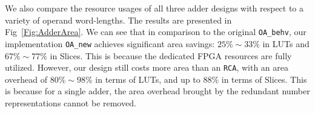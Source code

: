 \documentclass[conference]{IEEEtran}
\begin{document}
We also compare the resource usages of all three adder designs with respect to a variety of operand word-lengths. The results are presented in Fig~\ref{Fig:AdderArea}. We can see that in comparison to the original \texttt{OA\_behv}, our implementation \texttt{OA\_new} achieves significant area savings: $25\%\sim 33\%$ in LUTs and $67\%\sim77\%$ in Slices. This is because the dedicated FPGA resources are fully utilized. However, our design still costs more area than an \texttt{RCA}, with an area overhead of $80\%\sim98\%$ in terms of LUTs, and up to $88\%$ in terms of Slices. This is because for a single adder, the area overhead brought by the redundant number representations cannot be removed. 

\begin{figure}[tbp]
  \centering
\end{figure}
\end{document}
